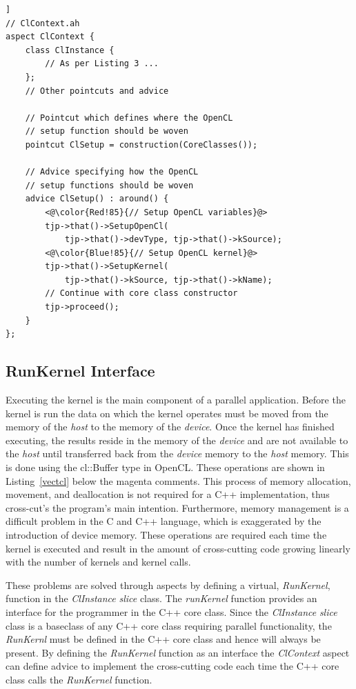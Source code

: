 \documentclass{sig-alternate-05-2015}
\begin{document}
\begin{lstlisting}[caption=Abstract aspect with the pointcut and advice for
OpenCL setup,label=clsetup,float=[!t]]
// ClContext.ah
aspect ClContext {
	class ClInstance {
		// As per Listing 3 ...
	};
	// Other pointcuts and advice

	// Pointcut which defines where the OpenCL
	// setup function should be woven
	pointcut ClSetup = construction(CoreClasses());
  
	// Advice specifying how the OpenCL
	// setup functions should be woven
	advice ClSetup() : around() {
		<@\color{Red!85}{// Setup OpenCL variables}@>
		tjp->that()->SetupOpenCl(
			tjp->that()->devType, tjp->that()->kSource);
		<@\color{Blue!85}{// Setup OpenCL kernel}@>
		tjp->that()->SetupKernel(
			tjp->that()->kSource, tjp->that()->kName); 
		// Continue with core class constructor
		tjp->proceed();
	}
};
\end{lstlisting}

\subsection{RunKernel Interface}

Executing the kernel is the main component of a parallel application. Before the
kernel is run the data on which the kernel operates must be moved from the
memory of the \textit{host} to the memory of the \textit{device}. Once the
kernel has finished executing, the results reside in the memory of the
\textit{device} and are not available to the \textit{host} until transferred
back from the \textit{device} memory to the \textit{host} memory. This is done
using the cl::Buffer type in OpenCL. These operations are shown in Listing~\ref{vectcl} 
below the magenta comments. This process of memory allocation, movement, and
deallocation is not required for a C++ implementation, thus cross-cut's the
program's main intention. Furthermore, memory management is a difficult problem
in the C and C++ language, which is exaggerated by the introduction of device
memory.  These operations are required each time the kernel is executed and
result in the amount of cross-cutting code growing linearly with the number of
kernels and kernel calls. 

These problems are solved through aspects by defining a virtual,
\textit{RunKernel}, function in the \textit{ClInstance} \textit{slice} class. 
The \textit{runKernel} function provides an interface for the programmer in 
the C++ core class. Since the \textit{ClInstance} \textit{slice} class is a 
baseclass of any C++ core class requiring parallel functionality, the
\textit{RunKernl} must be defined in the C++ core class and hence will always be
present. By defining the \textit{RunKernel} function as an interface the
\textit{ClContext} aspect can define advice to implement the cross-cutting code
each time the C++ core class calls the \textit{RunKernel} function.
\end{document}
